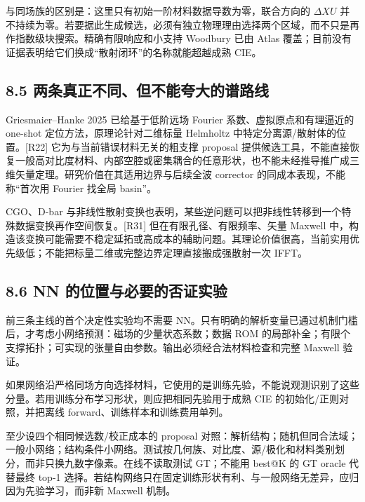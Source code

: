 \documentclass[11pt,a4paper]{article}
\begin{document}
与同场族的区别是：这里只有初始一阶材料数据导数为零，联合方向的
\(\Delta XU\)
并不持续为零。若要据此生成候选，必须有独立物理理由选择两个区域，而不只是再作指数级块搜索。精确有限响应和小支持
Woodbury 已由 Atlas
覆盖；目前没有证据表明给它们换成``散射闭环''的名称就能超越成熟 CIE。

\hypertarget{ux4e24ux6761ux771fux6b63ux4e0dux540cux4f46ux4e0dux80fdux5938ux5927ux7684ux8c31ux8defux7ebf}{%
\subsection{8.5
两条真正不同、但不能夸大的谱路线}\label{ux4e24ux6761ux771fux6b63ux4e0dux540cux4f46ux4e0dux80fdux5938ux5927ux7684ux8c31ux8defux7ebf}}

Griesmaier--Hanke 2025 已给基于低阶远场 Fourier
系数、虚拟原点和有理逼近的 one-shot 定位方法，原理论针对二维标量
Helmholtz 中特定分离源/散射体的位置。{[}R22{]}
它为与当前错误材料无关的粗支撑 proposal
提供候选工具，不能直接恢复一般高对比度材料、内部空腔或密集耦合的任意形状，也不能未经推导推广成三维矢量定理。研究价值在其适用边界与后续全波
corrector 的同成本表现，不能称``首次用 Fourier 找全局 basin''。

CGO、D-bar
与非线性散射变换也表明，某些逆问题可以把非线性转移到一个特殊数据变换再作空间恢复。{[}R31{]}
但在有限孔径、有限频率、矢量 Maxwell
中，构造该变换可能需要不稳定延拓或高成本的辅助问题。其理论价值很高，当前实用优先级低；不能把标量二维或完整边界定理直接搬成强散射一次
IFFT。

\hypertarget{nn-ux7684ux4f4dux7f6eux4e0eux5fc5ux8981ux7684ux5426ux8bc1ux5b9eux9a8c}{%
\subsection{8.6 NN
的位置与必要的否证实验}\label{nn-ux7684ux4f4dux7f6eux4e0eux5fc5ux8981ux7684ux5426ux8bc1ux5b9eux9a8c}}

前三条主线的首个决定性实验均不需要
NN。只有明确的解析变量已通过机制门槛后，才考虑小网络预测：磁场的少量状态系数；数据
ROM
的局部补全；有限个支撑拓扑；可实现的张量自由参数。输出必须经合法材料检查和完整
Maxwell 验证。

如果网络沿严格同场方向选择材料，它使用的是训练先验，不能说观测识别了这些分量。若用训练分布学习形状，则应把相同先验用于成熟
CIE 的初始化/正则对照，并把离线 forward、训练样本和训练费用单列。

至少设四个相同候选数/校正成本的 proposal
对照：解析结构；随机但同合法域；一般小网络；结构条件小网络。测试按几何族、对比度、源/极化和材料类别划分，而非只换九数字像素。在线不读取测试
GT；不能用 best@K 的 GT oracle 代替最终 top-1
选择。若结构网络只在固定训练形状有利、与一般网络无差异，应归因为先验学习，而非新
Maxwell 机制。
\end{document}
